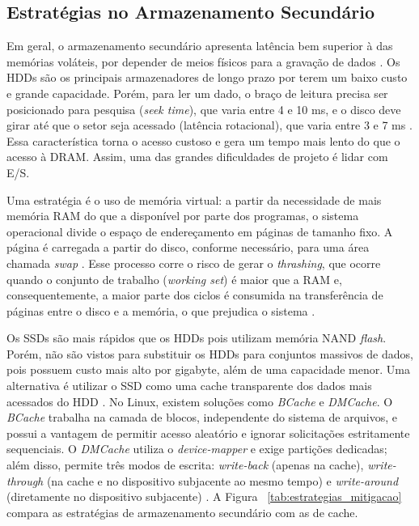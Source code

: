 \documentclass[portuguese]{sbcreviews-2025}%
\begin{document}
\subsection{Estratégias no Armazenamento Secundário} 
\label{sec:secundario}
Em geral, o armazenamento secundário apresenta latência bem superior à das memórias voláteis, por depender de meios físicos para a gravação de dados \citep{oliveira2019, stallings2010}. Os HDDs são os principais armazenadores de longo prazo por terem um baixo custo e grande capacidade. 
Porém, para ler um dado, o braço de leitura precisa ser posicionado para pesquisa (\textit{seek time}), que varia entre 4 e 10 ms, e o disco deve girar até que o setor seja acessado (latência rotacional), que varia entre 3 e 7 ms \citep{santos2015}. Essa característica torna o acesso custoso e 
gera um tempo mais lento do que o acesso à DRAM. Assim, uma das grandes dificuldades de projeto é lidar com E/S.

Uma estratégia é o uso de memória virtual: a partir da necessidade de mais memória RAM do que a disponível por parte dos programas, o sistema operacional divide o espaço de endereçamento em páginas de tamanho fixo. A página é carregada a partir do disco, conforme necessário, para uma área chamada 
\textit{swap} \citep{souza2023}. Esse processo corre o risco de gerar o \textit{thrashing}, que ocorre quando o conjunto de trabalho (\textit{working set}) é maior que a RAM e, consequentemente, a maior parte dos ciclos é consumida na transferência de páginas entre o disco e a memória, o que prejudica 
o sistema \citep{souza2023}. 

Os SSDs são mais rápidos que os HDDs pois utilizam memória NAND \textit{flash}. Porém, não são vistos para substituir os HDDs para conjuntos massivos de dados, pois possuem custo mais alto por gigabyte, além de uma capacidade menor. Uma alternativa é utilizar o SSD como uma cache transparente dos dados 
mais acessados do HDD \citep{santos2015}. No Linux, existem soluções como \textit{BCache} e \textit{DMCache}. O \textit{BCache} trabalha na camada de blocos, independente do sistema de arquivos, e possui a vantagem de permitir acesso aleatório e ignorar solicitações estritamente sequenciais. O \textit{DMCache} 
utiliza o \textit{device-mapper} e exige partições dedicadas; além disso, permite três modos de escrita: \textit{write-back} (apenas na cache), \textit{write-through} (na cache e no dispositivo subjacente ao mesmo tempo) e \textit{write-around} (diretamente no dispositivo subjacente) \citep{santos2015}. A Figura
~\ref{tab:estrategias_mitigacao} compara as estratégias de armazenamento secundário com as de cache.
\end{document}
